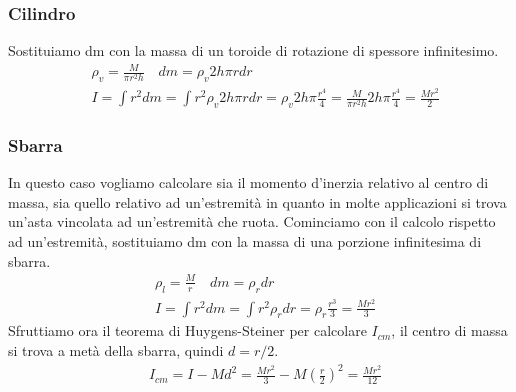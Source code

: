 \documentclass[10pt,a4paper]{article}
\begin{document}
\subsubsection*{Cilindro}
Sostituiamo dm con la massa di un toroide di rotazione di spessore infinitesimo.
\begin{align*}
	&\rho_v = \frac{M}{\pi r^2 h} \quad dm = \rho_v 2 h \pi r dr\\
	&I = \int r^2 dm = \int r^2 \rho_v 2 h \pi r dr = \rho_v 2 h \pi \frac{r^4}{4}= \frac{M}{\pi r^2 h} 2 h \pi \frac{r^4}{4} = \frac{M r^2}{2}
\end{align*}
\subsubsection*{Sbarra}
In questo caso vogliamo calcolare sia il momento d'inerzia relativo al centro di massa, sia quello relativo ad un'estremità in quanto in molte applicazioni si trova un'asta vincolata ad un'estremità che ruota. Cominciamo con il calcolo rispetto ad un'estremità, sostituiamo dm con la massa di una porzione infinitesima di sbarra. 
\begin{align*}
	&\rho_l = \frac{M}{r} \quad dm = \rho_r dr\\
	&I = \int r^2 dm = \int r^2 \rho_r dr = \rho_r \frac{r^3}{3} = \frac{M r^2}{3}
\end{align*}
Sfruttiamo ora il teorema di Huygens-Steiner per calcolare $I_{cm}$, il centro di massa si trova a metà della sbarra, quindi $d = r/2$.
\begin{align*}
	&I_{cm} = I - M d^2 = \frac{M r^2}{3} - M (\frac{r}{2})^2 = \frac{M r^2}{12}
\end{align*}
\end{document}
